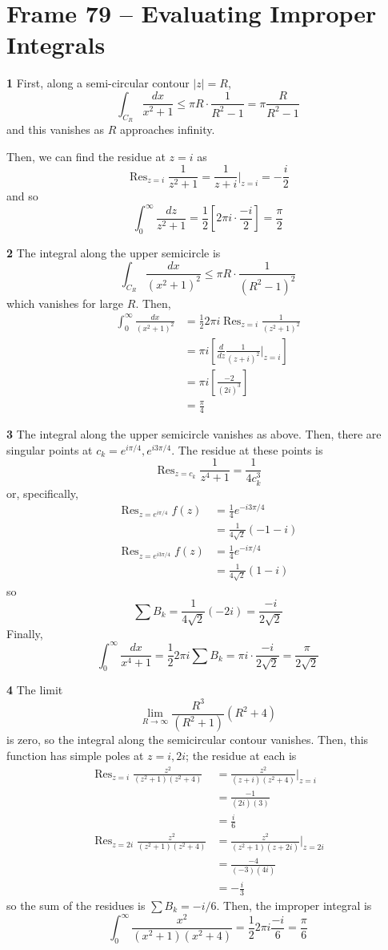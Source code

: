 \documentclass{article}
\DeclareMathOperator{\Res}{Res}
\begin{document}
\section{Frame 79 -- Evaluating Improper Integrals}
\textbf{1}
First, along a semi-circular contour $|z| = R$,
\[
	\int_{C_R} \frac{dx}{x^2 + 1}
	\le \pi R \cdot \frac{1}{R^2 - 1}
	= \pi \frac{R}{R^2 - 1}
\]
and this vanishes as $R$ approaches infinity.

Then, we can find the residue at $z = i$ as
\[
	\Res_{z=i} \frac{1}{z^2 + 1}
	= \frac{1}{z + i} \Big|_{z=i}
	= -\frac{i}{2}
\]
and so
\[
	\int_0^\infty \frac{dz}{z^2 + 1}
	= \frac{1}{2} \left[2\pi i \cdot \frac{-i}{2} \right]
	= \frac{\pi}{2}
\]

\textbf{2}
The integral along the upper semicircle is
\[
	\int_{C_R} \frac{dx}{(x^2 + 1)^2} 
	\le \pi R \cdot \frac{1}{(R^2 - 1)^2}
\]
which vanishes for large $R$. Then,
\begin{align*}
	\int_0^\infty \frac{dx}{(x^2 + 1)^2}
	&= \frac{1}{2} 2\pi i \Res_{z=i} \frac{1}{(z^2 + 1)^2} \\
	&= \pi i \left[ \frac{d}{dz} \frac{1}{(z + i)^2} \Big|_{z=i} \right] \\
	&= \pi i \left[ \frac{-2}{(2i)^3} \right] \\
	&= \frac{\pi}{4}
\end{align*}

\textbf{3}
The integral along the upper semicircle vanishes as above. Then, there are singular points at $c_k = e^{i\pi/4}, e^{i3\pi/4}$. The residue at these points is
\[
	\Res_{z=c_k} \frac{1}{z^4 + 1}
	= \frac{1}{4c_k^3}
\]
or, specifically,
\begin{align*}
	\Res_{z=e^{i \pi/4}} f(z) &= \frac{1}{4} e^{-i3\pi/4} \\
	&= \frac{1}{4\sqrt{2}} (-1 - i) \\ 
	\Res_{z=e^{i3\pi/4}} f(z) &= \frac{1}{4} e^{-i \pi/4} \\
	&= \frac{1}{4\sqrt{2}} ( 1 - i) 
\end{align*}
so
\[
	\sum B_k = \frac{1}{4\sqrt{2}} (-2i) = \frac{-i}{2\sqrt{2}}
\]
Finally,
\[
	\int_0^\infty \frac{dx}{x^4 + 1} 
	= \frac{1}{2} 2\pi i \sum B_k
	= \pi i \cdot \frac{-i}{2\sqrt{2}}
	= \frac{\pi}{2\sqrt{2}}
\]

\textbf{4}
The limit
\[
	\lim_{R \to \infty} \frac{R^3}{(R^2 + 1)}{(R^2 + 4)}
\]
is zero, so the integral along the semicircular contour vanishes. Then, this function has simple poles at $z = i, 2i$; the residue at each is
\begin{align*}
	\Res_{z=i} \frac{z^2}{(z^2 + 1)(z^2 + 4)}
	&= \frac{z^2}{(z+i)(z^2 + 4)} \Big|_{z=i} \\
	&= \frac{-1}{(2i)(3)} \\
	&= \frac{i}{6} \\
	\Res_{z=2i} \frac{z^2}{(z^2 + 1)(z^2 + 4)}
	&= \frac{z^2}{(z^2+1)(z + 2i)} \Big|_{z=2i} \\
	&= \frac{-4}{(-3)(4i)} \\
	&= -\frac{i}{3} 
\end{align*}
so the sum of the residues is $\sum B_k = -i/6$. Then, the improper integral is
\[
	\int_0^\infty \frac{x^2}{(x^2 + 1)(x^2 + 4)}
	= \frac{1}{2} 2\pi i \frac{-i}{6}
	= \frac{\pi}{6}
\]
\end{document}
